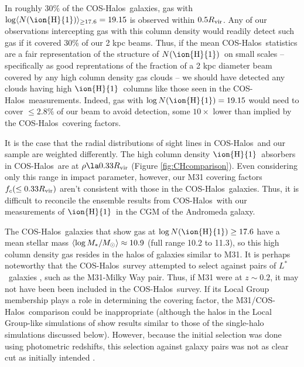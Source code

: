 \documentclass[12pt,preprint]{aastex6}
\newcommand{\HI}{\ensuremath{\mbox{\ion{H}{1}}}}
\newcommand{\NHI}{\ensuremath{N(\mbox{\ion{H}{1}})}\relax}
\newcommand{\logNHI}{\ensuremath{\log N(\mbox{\ion{H}{1}})}\relax}
\newcommand{\Rvir}{\ensuremath{R_{\rm vir}}\relax}
\newcommand{\msun}{\ensuremath{M_\odot}\relax}
\newcommand{\lstar}{\ensuremath{L^*}}
\newcommand{\coshalos}{COS-Halos}
\begin{document}
In roughly 30\% of the \coshalos\ galaxies, gas with
$\log \langle \NHI \rangle_{\ge17.6} = 19.15$ is observed within
$0.5 \Rvir$. Any of our observations intercepting gas with this column
density would readily detect such gas if it covered 30\% of our 2 kpc
beams. Thus, if the mean \coshalos\ statistics are a fair
representation of the structure of \NHI\ on small scales --
specifically as good reprentations of the fraction of a 2 kpc diameter
beam covered by any high column density gas clouds -- we should have
detected any clouds having high \HI\ columns like those seen in the
\coshalos\ measurements. Indeed, gas with $\logNHI = 19.15$ would need
to cover $\le 2.8\%$ of our beam to avoid detection, some $10\times$
lower than implied by the \coshalos\ covering factors.

It is the case that the radial distributions of sight lines in
\coshalos\ and our sample are weighted differently. The high column
density \HI\ absorbers in \coshalos\ are at $\rho \la 0.33 \Rvir$
(Figure \ref{fig:CHcomparison}). Even considering only this range in
impact parameter, however, our M31 covering factors
$f_c(\le 0.33 \Rvir)$ aren't consistent with those in the \coshalos\
galaxies. Thus, it is difficult to reconcile the ensemble results from
\coshalos\ with our measurements of \HI\ in the CGM of the Andromeda
galaxy.

The \coshalos\ galaxies that show gas at $\log \NHI \ge 17.6$ have a
mean stellar mass $\langle \log M_*/\msun \rangle \approx 10.9$ (full
range 10.2 to 11.3), so this high column density gas resides in the
halos of galaxies similar to M31. It is perhaps noteworthy that the
\coshalos\ survey attempted to select against pairs of \lstar\
galaxies \citep{tumlinson2013}, such as the M31-Milky Way pair. Thus,
if M31 were at $z\sim0.2$, it may not have been been included in the
\coshalos\ survey. If its Local Group membership plays a role in
determining the covering factor, the M31/\coshalos\ comparison could
be inappropriate (although the halos in the Local Group-like
simulations of \citealt{nuza2014} show results similar to those of the
single-halo simulations discussed below).  However, because the
initial selection was done using photometric redshifts, this selection
against galaxy pairs was not as clear cut as initially intended
\citep{werk2012}.

\end{document}
